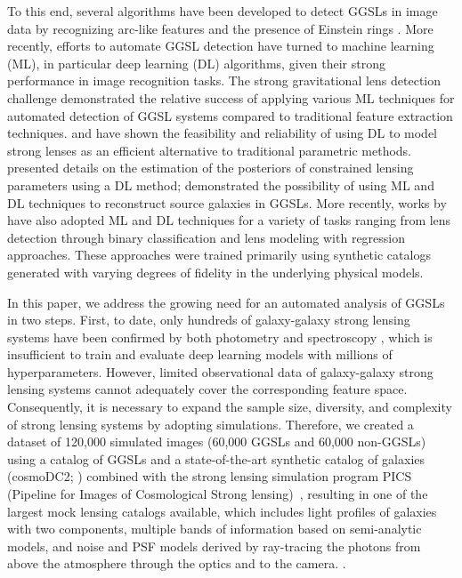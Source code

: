 \documentclass[12pt, twocolumn, apj]{openjournal}
\begin{document}
To this end, several algorithms have been developed to detect GGSLs in image data by recognizing arc-like features and the presence of Einstein rings \citep{Gavazzi2014,Joseph2014,Paraficz2016,Bom2017}. 
More recently, efforts to automate GGSL detection have turned to machine learning (ML), in particular deep learning (DL) algorithms, given their strong performance in image recognition tasks. The strong gravitational lens detection challenge \citep{Metcalf2019} demonstrated the relative success of applying various ML techniques for automated detection of GGSL systems \citep{Jacobs2017, Petrillo2017, Ostrovski2017, Bom2017, Hartley2017, Lanusse2018, Avestruz2019} compared to traditional feature extraction techniques. 
\cite{Hezaveh2017} and \cite{Pearson2019} have shown the feasibility and reliability of using DL to model strong lenses as an efficient alternative to traditional parametric methods. \cite{Perreault-Levasseur2017} presented details on the estimation of the posteriors of constrained lensing parameters using a DL method; \cite{Morningstar2018, Morningstar2019} demonstrated the possibility of using ML and DL techniques to reconstruct source galaxies in GGSLs. More recently, works by \cite{canameras2020holismokes, he2020deep, li2020new, Wagner-Carena2021, pearson2021strong, park2021large} have also adopted ML and DL techniques for a variety of tasks ranging from lens detection through binary classification and lens modeling with regression approaches. These approaches were trained primarily using synthetic catalogs generated with varying degrees of fidelity in the underlying physical models.  


In this paper, we address the growing need for an automated analysis of GGSLs in two steps. First, to date, only hundreds of galaxy-galaxy strong lensing systems have been confirmed by both photometry and spectroscopy \citep[][]{Treu2010SLReview}, which is insufficient to train and evaluate deep learning models with millions of hyperparameters. However, limited observational data of galaxy-galaxy strong lensing systems cannot adequately cover the corresponding feature space. Consequently, it is necessary to expand the sample size, diversity, and complexity of strong lensing systems by adopting simulations. Therefore, we created a dataset of 120,000 simulated images (60,000 GGSLs and 60,000 non-GGSLs) using a catalog of GGSLs and a state-of-the-art synthetic catalog of galaxies (cosmoDC2; \citealt{CosmoDC2}) combined with the strong lensing simulation program PICS (Pipeline for Images of Cosmological Strong lensing)~\citep{PICS}, resulting in one of the largest mock lensing catalogs available, which includes light profiles of galaxies with two components, multiple bands of information based on semi-analytic models, and noise and PSF models derived by ray-tracing the photons from above the atmosphere through the optics and to the camera. \citep[][]{Connolly2010}. 
\end{document}
